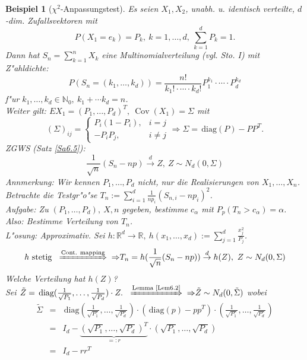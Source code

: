 \documentclass[a4paper,11pt]{book}
\newcommand{\R}{{\mathbb R}}
\newcommand{\N}{{\mathbb N}}
\newcommand{\diag}{\ensuremath{\,\text{diag}}}
\DeclareMathOperator{\cov}{Cov}
\newcommand{\folgtnach}[1]{\ensuremath{\DOTSB\;\xRightarrow{\text{#1}}\;}}
\def\dto{\stackrel{d}{\rightarrow}}
\newtheorem{Bsp}{Beispiel}[chapter]
\theoremstyle{nonumberplain}
\begin{document}
\begin{Bsp}[$\chi^2$-Anpassungstest] \label{Bsp6.1}
Es seien $X_1,X_2$, unabh. u. identisch verteilte, $d$-dim. Zufallsvektoren mit
\[
P(X_1 = e_k) = P_k,\ k=1,\dots,d,\ \sum_{k=1}^d P_k = 1.
\]
Dann hat $S_n = \sum_{k=1}^n X_k$ eine Multinomialverteilung (vgl. Sto. I) mit Z"ahldichte:
\[
P(S_n = (k_1,\dots,k_d)) = \frac{n!}{k_1! \cdot \cdots \cdot k_d!}P_1^{k_1} \cdot \cdots \cdot P_d^{k_d}
\]
f"ur $k_1,\dots,k_d \in \N_0,\ k_1 + \cdots k_d = n$.\\
Weiter gilt: $EX_1 = (P_1,\dots,P_d)^T,\ \cov (X_1) = \Sigma$ mit
\[
(\Sigma)_{ij} = \begin{cases}
P_i(1-P_i), & i = j \\
-P_iP_j, & i \not= j
\end{cases}
\Rightarrow \Sigma = \diag(P) - PP^T.
\]
ZGWS (Satz \ref{Sa6.5}):
\[
\frac1{\sqrt{n}} (S_n - np) \dto Z,\ Z \sim N_d(0,\Sigma)
\]
Annmerkung: Wir kennen $P_1,\dots,P_d$ nicht, nur die Realisierungen von $X_1,\dots,X_n$. Betrachte die Testgr"o"se $T_n := \sum_{i=1}^d \frac1{np_i} (S_{n,i} - n p_i)^2$.\\
Aufgabe: Zu $(P_1,\dots,P_d),\ X,n$ gegeben, bestimme $c_{\alpha}$ mit $P_p(T_n > c_{\alpha}) = \alpha$. Also: Bestimme Verteilung von $T_n$.\\
L"osung: Approximativ. Sei $h: \R^d \rightarrow \R,\ h(x_1,\dots,x_d) := \sum_{j=1}^d \frac{x_j^2}{P_j}$.
\[
h \text{ stetig } \folgtnach{Cont. mapping}{\Rightarrow} T_n =  h(\frac1{\sqrt{n}}(S_n - np)) \dto h(Z),\ Z \sim N_d (0,\Sigma)
\]
Welche Verteilung hat $h(Z)$?\\
Sei $\tilde{Z} = \diag (\frac1{\sqrt{P_1}},\dots,\frac1{\sqrt{P_d}}) \cdot Z.\ \folgtnach{Lemma \ref{Lem6.2}}{\Rightarrow} \tilde{Z} \sim N_d(0,\tilde{\Sigma})$ wobei
\begin{eqnarray*}
\tilde{\Sigma} & = & \diag (\frac1{\sqrt{P_1}},\dots,\frac1{\sqrt{P_d}}) \cdot (\diag (p)-pp^T) \cdot (\frac1{\sqrt{P_1}},\dots,\frac1{\sqrt{P_d}}) \\
& = & I_d - \underbrace{(\sqrt{P_1},\dots,\sqrt{P_d})^T}_{=: r} \cdot (\sqrt{P_1},\dots,\sqrt{P_d}) \\
& = & I_d - rr^T
\end{eqnarray*}


\end{Bsp}
\end{document}
